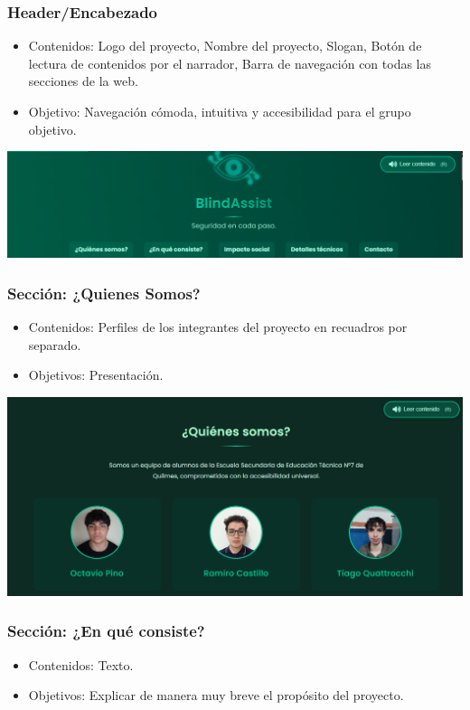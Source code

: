 \documentclass[12pt,a4paper]{article}
\begin{document}
\subsubsection*{Header/Encabezado}
\begin{itemize}
\item Contenidos: Logo del proyecto, Nombre del proyecto, Slogan, Botón de lectura de contenidos por el narrador, Barra de navegación con todas las secciones de la web.
\item Objetivo: Navegación cómoda, intuitiva y accesibilidad para el grupo objetivo.
\end{itemize}

    \includegraphics[width=\linewidth]{Carpeta tecnica/header.png}

\subsubsection*{ Sección: ¿Quienes Somos? }
\begin{itemize}
    \item Contenidos: Perfiles de los integrantes del proyecto en recuadros por separado.
    \item Objetivos: Presentación.
\end{itemize}
\includegraphics[width=\linewidth]{Carpeta tecnica/qnes.png}
\subsubsection*{ Sección: ¿En qué consiste?}
\begin{itemize}
    \item Contenidos: Texto.
    \item Objetivos: Explicar de manera muy breve el propósito del proyecto.
\end{itemize} 
\end{document}
